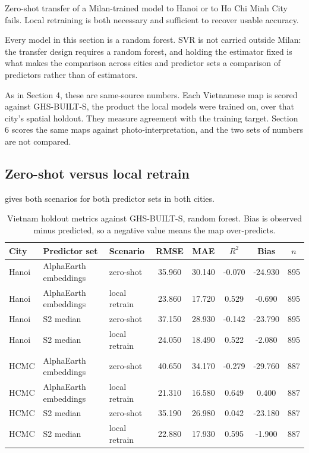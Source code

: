 \documentclass[11pt,a4paper]{article}
\begin{document}
Zero-shot transfer of a Milan-trained model to Hanoi or to Ho Chi Minh City
fails. Local retraining is both necessary and sufficient to recover usable
accuracy.

Every model in this section is a random forest. SVR is not carried outside
Milan: the transfer design requires a random forest, and holding the estimator
fixed is what makes the comparison across cities and predictor sets a comparison
of predictors rather than of estimators.

As in Section 4, these are same-source numbers. Each Vietnamese map is scored
against GHS-BUILT-S, the product the local models were trained on, over that
city's spatial holdout. They measure agreement with the training target. Section
6 scores the same maps against photo-interpretation, and the two sets of numbers
are not compared.

\subsection{Zero-shot versus local retrain}

 gives both scenarios for both predictor sets in both
cities.

\begin{table}[htbp]
  \centering
  \caption{Vietnam holdout metrics against GHS-BUILT-S, random forest. Bias is
  observed minus predicted, so a negative value means the map over-predicts.}
  \label{tab:vietnam-holdout}
  \begin{tabular}{l l l S[table-format=2.3] S[table-format=2.3] S[table-format=-1.3] S[table-format=-2.3] c}
    \toprule
    {City} & {Predictor set} & {Scenario} & {RMSE} & {MAE} & {$R^2$} & {Bias} & {$n$} \\
    \midrule
    Hanoi & AlphaEarth embeddings & zero-shot     & 35.960 & 30.140 & -0.070 & -24.930 & 895 \\
    Hanoi & AlphaEarth embeddings & local retrain & 23.860 & 17.720 & 0.529  & -0.690  & 895 \\
    Hanoi & S2 median             & zero-shot     & 37.150 & 28.930 & -0.142 & -23.790 & 895 \\
    Hanoi & S2 median             & local retrain & 24.050 & 18.490 & 0.522  & -2.080  & 895 \\
    HCMC  & AlphaEarth embeddings & zero-shot     & 40.650 & 34.170 & -0.279 & -29.760 & 887 \\
    HCMC  & AlphaEarth embeddings & local retrain & 21.310 & 16.580 & 0.649  & 0.400   & 887 \\
    HCMC  & S2 median             & zero-shot     & 35.190 & 26.980 & 0.042  & -23.180 & 887 \\
    HCMC  & S2 median             & local retrain & 22.880 & 17.930 & 0.595  & -1.900  & 887 \\
    \bottomrule
  \end{tabular}
\end{table}
\end{document}
